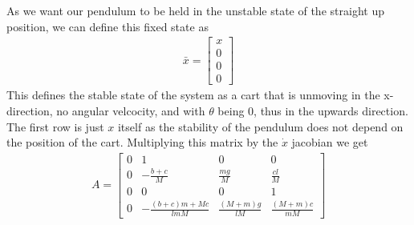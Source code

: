 \documentclass{article}
\begin{document}
As we want our pendulum to be held in the unstable state of the straight up position, we can define this fixed
state as 
\begin{align*}
    \bar{x} = \begin{bmatrix}
        x \\
        0 \\
        0 \\
        0
    \end{bmatrix}
\end{align*}
This defines the stable state of the system as a cart that is unmoving in the x-direction, no angular velcocity, and 
with $\theta$ being 0, thus in the upwards direction. The first row is just $x$ itself as the stability of the pendulum
does not depend on the position of the cart. Multiplying this matrix by the  
$\dot{x}$ jacobian we get
\begin{align*}
    A = \begin{bmatrix}
        0 & 1 & 0 & 0 \\
        0 & -\frac{b+c}{M} & \frac{mg}{M} & \frac{cl}{M}\\
        0 & 0 & 0 & 1\\
        0 & -\frac{(b+c)m+Mc}{lmM} & \frac{(M+m)g}{lM} & \frac{(M+m)c}{mM}
    \end{bmatrix}
\end{align*}
\end{document}
